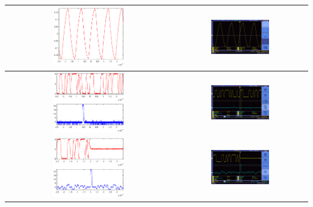 \documentclass[12pt]{article}
\begin{document}
\begin{longtable}{|c|c|}
\includegraphics[width=0.45\textwidth]{rebuild/003}&\includegraphics[width=0.45\textwidth]{data3/new2/F0013TEK}\\ \hline
\includegraphics[width=0.45\textwidth]{rebuild/004}&\includegraphics[width=0.45\textwidth]{data/new/F0029TEK}\\ \hline
\includegraphics[width=0.45\textwidth]{rebuild/005}&\includegraphics[width=0.45\textwidth]{data/new/F0033TEK}\\ \hline

\end{longtable}
\end{document}
